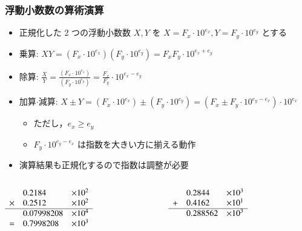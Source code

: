 \begin{frame}
\frametitle{浮動小数数の算術演算}
  \begin{itemize}
\item 正規化した 2 つの浮動小数数 \(X, Y\) を \(X=F_x\cdot 10^{e_x}, Y=F_y\cdot 10^{e_y}\) とする
\item 乗算: \(XY=(F_x\cdot 10^{e_x})(F_y\cdot 10^{e_y})=F_xF_y\cdot 10^{e_x+e_y}\)
\item 除算: \(\frac{X}{Y}=\frac{(F_x\cdot 10^{e_x})}{(F_y\cdot 10^{e_y})}=\frac{F_x}{F_y}\cdot 10^{e_x-e_y}\)
\item 加算\(\cdot\)減算: \(X\pm Y=(F_x\cdot 10^{e_x})\pm(F_y\cdot 10^{e_y})=(F_x\pm F_y\cdot 10^{e_y-e_x})\cdot 10^{e_x}\)
    \begin{itemize}
\item ただし，\(e_x\geq e_y\)
\item \(F_y\cdot 10^{e_y-e_x}\) は指数を大きい方に揃える動作
    \end{itemize}
\item 演算結果も正規化するので指数は調整が必要
  \end{itemize}
  \begin{example}[算術演算の例]
    \begin{columns}[t]
      \begin{column}{4.5cm}
        \begin{math}
          \begin{array}{cll}
&0.2184&\times 10^2\\
\times&0.2512&\times 10^2\\
\hline
&0.07998208&\times 10^4\\
=&0.7998208&\times 10^3\\
          \end{array}
        \end{math}
      \end{column}
      \begin{column}{4.5cm}
        \begin{math}
          \begin{array}{cll}
&0.2844&\times 10^3\\
+&0.4162&\times 10^1\\
\hline
&0.288562&\times 10^3\\
          \end{array}
        \end{math}
      \end{column}
    \end{columns}
  \end{example}
\end{frame}
